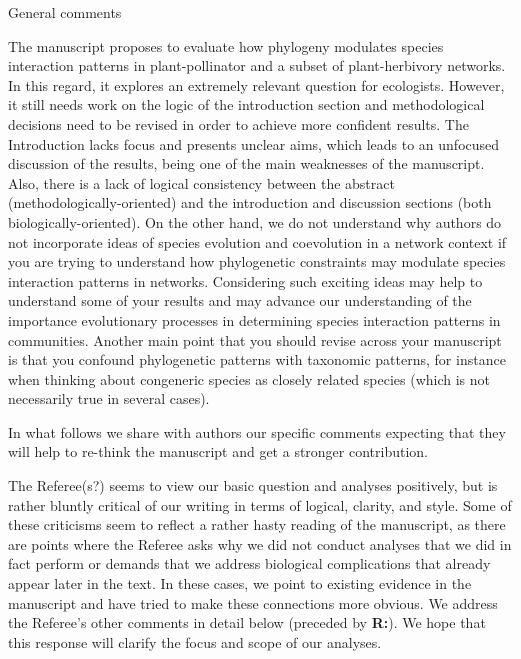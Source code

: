 \documentclass[12pt]{letter}
\newenvironment{refquote}{\bigskip \begin{it}}{\end{it}\smallskip}
\begin{document}
	\begin{refquote}
	General comments

	The manuscript proposes to evaluate how phylogeny modulates species interaction patterns in plant-pollinator and a subset of plant-herbivory networks. In this regard, it explores an extremely relevant question for ecologists. However, it still needs work on the logic of the introduction section and methodological decisions need to be revised in order to achieve more confident results. The Introduction lacks focus and presents unclear aims, which leads to an unfocused discussion of the results, being one of the main weaknesses of the manuscript. Also, there is a lack of logical consistency between the abstract (methodologically-oriented) and the introduction and discussion sections (both biologically-oriented). On the other hand, we do not understand why authors do not incorporate ideas of species evolution and coevolution in a network context if you are trying to understand how phylogenetic constraints may modulate species interaction patterns in networks. Considering such exciting ideas may help to understand some of your results and may advance our understanding of  the importance evolutionary processes in determining species interaction patterns in communities.
	Another main point that you should revise across your manuscript is that you confound phylogenetic patterns with taxonomic patterns, for instance when thinking about congeneric species as closely related species (which is not necessarily true in several cases).

	\smallskip

	In what follows we share with authors our specific comments expecting that they will help to re-think the manuscript and get a stronger contribution.

	\end{refquote}


	The Referee(s?) seems to view our basic question and analyses positively, but is rather bluntly critical of our writing in terms of logical, clarity, and style. Some of these criticisms seem to reflect a rather hasty reading of the manuscript, as there are points where the Referee asks why we did not conduct analyses that we did in fact perform or demands that we address biological complications that already appear later in the text. In these cases, we point to existing evidence in the manuscript and have tried to make these connections more obvious. We address the Referee's other comments in detail below (preceded by \textbf{R:}). We hope that this response will clarify the focus and scope of our analyses.
\end{document}
